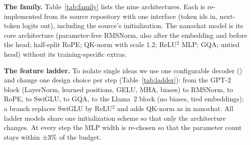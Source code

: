 \textbf{The family.} Table~\ref{tab:family} lists the nine architectures. Each is re-implemented from its source repository
with one interface (token ids in, next-token logits out), including the source's initialization. The nanochat model is its
core architecture (parameter-free RMSNorm, also after the embedding and before the head; half-split RoPE; QK-norm with
scale 1.2; ReLU$^2$ MLP; GQA; untied head) without its training-specific extras.

\begin{table}[t]
\centering\footnotesize
\caption{The nine architectures. ``State'': what inference keeps about the past.}
\label{tab:family}
\setlength{\tabcolsep}{2.5pt}
\end{table}

\textbf{The feature ladder.} To isolate single ideas we use one configurable decoder () and change one
design choice per step (Table~\ref{tab:ladder}): from the GPT-2 block (LayerNorm, learned positions, GELU, MHA, biases)
to RMSNorm, to RoPE, to SwiGLU, to GQA, to the Llama~2 block (no biases, tied embeddings); a branch replaces SwiGLU by
ReLU$^2$ and adds QK-norm as in nanochat. All ladder models share one initialization scheme so that only the architecture
changes. At every step the MLP width is re-chosen so that the parameter count stays within $\pm3\%$ of the budget.

